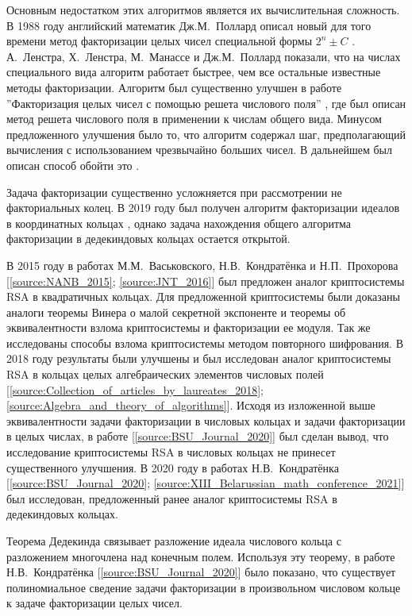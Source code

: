 \documentclass[_00_dissertation.tex]{subfiles}
\begin{document}
Основным недостатком этих алгоритмов является их вычислительная сложность.
В 1988 году английский математик Дж.М.~Поллард описал новый для того времени метод факторизации целых чисел специальной формы $2^n \pm C$ \cite{source:Pollard}.
А.~Ленстра, Х.~Ленстра, М.~Манассе и Дж.М.~Поллард показали, что на числах специального вида алгоритм работает быстрее, чем все остальные известные методы факторизации.
Алгоритм был существенно улучшен в работе ''Факторизация целых чисел с помощью решета числового поля'' \cite{source:Buhler}, где был описан метод решета числового поля в применении к числам общего вида.
Минусом предложенного улучшения было то, что алгоритм содержал шаг, предполагающий вычисления с использованием чрезвычайно больших чисел.
В дальнейшем был описан способ обойти это \cite{source:Couveignes}.

Задача факторизации существенно усложняется при рассмотрении не факториальных колец.
В 2019 году был получен алгоритм факторизации идеалов в координатных кольцах \cite{source:Darkey-Mensah}, однако задача нахождения общего алгоритма факторизации в дедекиндовых кольцах остается открытой.

В 2015 году в работах М.М.~Васьковского, Н.В.~Кондратёнка и Н.П.~Прохорова [\ref{source:NANB_2015}; \ref{source:JNT_2016}] был предложен аналог криптосистемы RSA в квадратичных кольцах.
Для предложенной криптосистемы были доказаны аналоги теоремы Винера о малой секретной экспоненте и теоремы об эквивалентности взлома криптосистемы и факторизации ее модуля.
Так же исследованы способы взлома криптосистемы методом повторного шифрования.
В 2018 году результаты были улучшены и был исследован аналог криптосистемы RSA в кольцах целых алгебраических элементов числовых полей [\ref{source:Collection_of_articles_by_laureates_2018}; \ref{source:Algebra_and_theory_of_algorithms}].
Исходя из изложенной выше эквивалентности задачи факторизации в числовых кольцах и задачи факторизации в целых числах, в работе [\ref{source:BSU_Journal_2020}] был сделан вывод, что исследование криптосистемы RSA в числовых кольцах не принесет существенного улучшения.
В 2020 году в работах Н.В.~Кондратёнка [\ref{source:BSU_Journal_2020}; \ref{source:XIII_Belarussian_math_conference_2021}] был исследован, предложенный ранее аналог криптосистемы RSA в дедекиндовых кольцах.

Теорема Дедекинда связывает разложение идеала числового кольца с разложением многочлена над конечным полем.
Используя эту теорему, в работе Н.В.~Кондратёнка [\ref{source:BSU_Journal_2020}] было показано, что существует полиномиальное сведение задачи факторизации в произвольном числовом кольце к задаче факторизации целых чисел.
\end{document}
